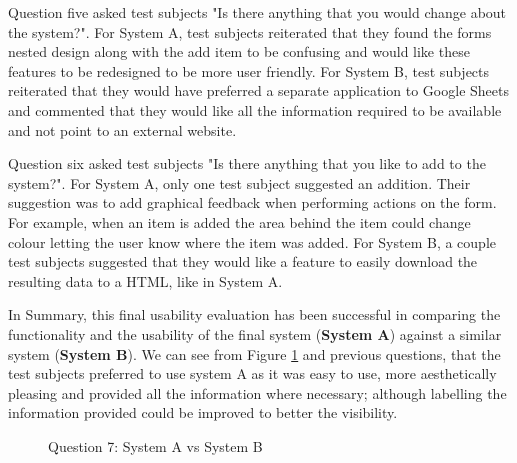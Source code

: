 {Question five asked test subjects "Is there anything that you would change about the system?". For System A, test subjects reiterated that they found the forms nested design along with the add item to be confusing and would like these features to be redesigned to be more user friendly. For System B, test subjects reiterated that they would have preferred a separate application to Google Sheets and commented that they would like all the information required to be available and not point to an external website.

}

\newpage
Question six asked test subjects "Is there anything that you like to add to the system?". For System A, only one test subject suggested an addition. Their suggestion was to add graphical feedback when performing actions on the form. For example, when an item is added the area behind the item could change colour letting the user know where the item was added. For System B, a couple test subjects suggested that they would like a feature to easily download the resulting data to a HTML, like in System A.

In Summary, this final usability evaluation has been successful in comparing the functionality and the usability of the final system (\textbf{System A}) against a similar system (\textbf{System B}). We can see from Figure \ref{fig:finalQ8} and previous questions, that the test subjects preferred to use system A as it was easy to use, more aesthetically pleasing and provided all the information where necessary; although labelling the information provided could be improved to better the visibility.\newline

\begin{figure}[!h]
  \centering
  \begin{minipage}[b]{0.47\textwidth}
    \caption{Question 7: System A vs System B}
    \label{fig:finalQ8}
  \end{minipage}
\end{figure}


